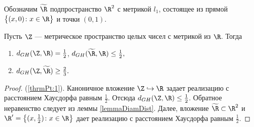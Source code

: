 Обозначим \( \widetilde \R \) подпространство \( \R^2 \) с метрикой
\( l_1 \), состоящее из прямой \( \big\{(x,0) \colon x\in \R\big\} \)
и точки \( (0,1) \).
\begin{theorem}
  Пусть \( \Z \) --- метрическое  пространство целых чисел с метрикой
  из \( \R \). Тогда
  \begin{enumerate}
    \item \( d_{GH}(\Z, \R) = \frac 1 2 \), \( d_{GH}(\widetilde \R,
      \R)\le \frac 1 2 , \)\label{thrmPt:1}
    \item \( d_{GH}(\Z, \widetilde \R) \ge \frac 2 3 . \)\label{thrmPt:2}
  \end{enumerate}
  \label{thrmRUltraMetric}
\end{theorem}
\begin{proof}
  (\ref{thrmPt:1}). Каноничное вложение \( \Z \hookrightarrow \R \)
  задает реализацию с расстоянием Хаусдорфа равным \( \frac 1 2 \).
  Отсюда \( d_{GH}(\Z,\R) \le \frac 1 2 \). Обратное неравенство
  следует из леммы \ref{lemmaDiamDist}. Далее, вложение \( \widetilde
  \R \subset \R^2 \) и \( \R' = \left\{(x,\frac 1 2) \colon x \in \R\right\} \)
  дает реализацию с расстоянием Хаусдорфа равным \( \frac 1 2 \).


\end{proof}
